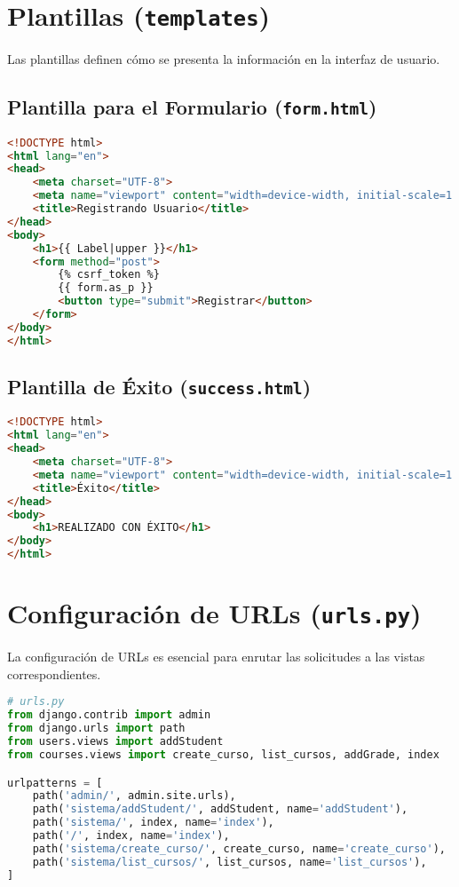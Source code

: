 \section{Plantillas (\texttt{templates})}

Las plantillas definen cómo se presenta la información en la interfaz de usuario.

\subsection{Plantilla para el Formulario (\texttt{form.html})}

\begin{lstlisting}[language=HTML, caption=Plantilla para el Formulario]
<!DOCTYPE html>
<html lang="en">
<head>
    <meta charset="UTF-8">
    <meta name="viewport" content="width=device-width, initial-scale=1.0">
    <title>Registrando Usuario</title>
</head>
<body>
    <h1>{{ Label|upper }}</h1>
    <form method="post">
        {% csrf_token %}
        {{ form.as_p }}
        <button type="submit">Registrar</button>
    </form>
</body>
</html>
\end{lstlisting}

\subsection{Plantilla de Éxito (\texttt{success.html})}

\begin{lstlisting}[language=HTML, caption=Plantilla de Éxito]
<!DOCTYPE html>
<html lang="en">
<head>
    <meta charset="UTF-8">
    <meta name="viewport" content="width=device-width, initial-scale=1.0">
    <title>Éxito</title>
</head>
<body>
    <h1>REALIZADO CON ÉXITO</h1>
</body>
</html>
\end{lstlisting}

\section{Configuración de URLs (\texttt{urls.py})}

La configuración de URLs es esencial para enrutar las solicitudes a las vistas correspondientes.

\begin{lstlisting}[language=Python, caption=Configuración de URLs]
# urls.py
from django.contrib import admin
from django.urls import path
from users.views import addStudent
from courses.views import create_curso, list_cursos, addGrade, index

urlpatterns = [
    path('admin/', admin.site.urls),
    path('sistema/addStudent/', addStudent, name='addStudent'),
    path('sistema/', index, name='index'),
    path('/', index, name='index'),
    path('sistema/create_curso/', create_curso, name='create_curso'),
    path('sistema/list_cursos/', list_cursos, name='list_cursos'),
]
\end{lstlisting}

